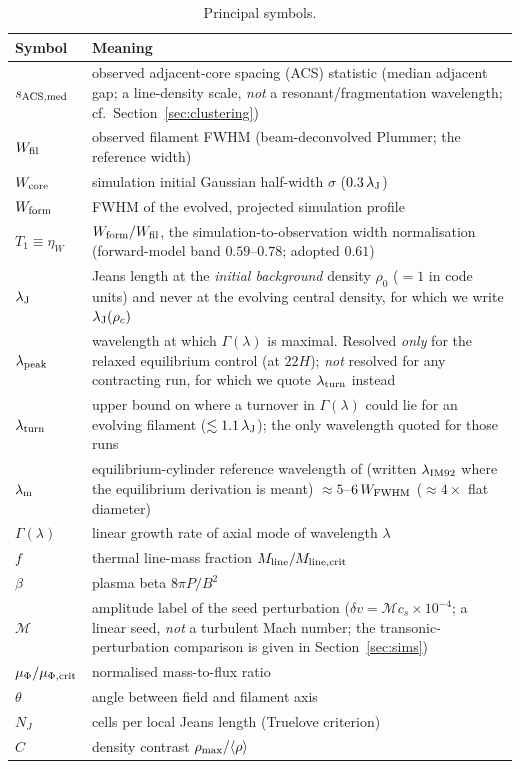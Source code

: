 \documentclass[usenatbib,twoside,twocolumn]{mnras}
\begin{document}
\begin{table}
\caption{Principal symbols.}
\label{tab:symbols}
\footnotesize
\setlength{\tabcolsep}{4pt}
\begin{tabular}{lp{6.1cm}}
\toprule
Symbol & Meaning \\
\midrule
$s_{\rm ACS,med}$ & observed adjacent-core spacing (ACS) statistic (median adjacent gap; a line-density scale, \emph{not} a resonant/fragmentation wavelength; cf.\ Section~\ref{sec:clustering}) \\
$W_{\rm fil}$ & observed filament FWHM (beam-deconvolved Plummer; the reference width) \\
$W_{\rm core}$ & simulation initial Gaussian half-width $\sigma$ ($0.3\,\lambda_{\rm J}$) \\
$W_{\rm form}$ & FWHM of the evolved, projected simulation profile \\
$T_1\!\equiv\!\eta_W$ & $W_{\rm form}/W_{\rm fil}$, the simulation-to-observation width normalisation (forward-model band $0.59$--$0.78$; adopted $0.61$) \\
$\lambda_{\rm J}$ & Jeans length at the \emph{initial background} density $\rho_0$ ($=1$ in code units) and never at the evolving central density, for which we write $\lambda_{\rm J}(\rho_c)$ \\
$\lambda_{\rm peak}$ & wavelength at which $\Gamma(\lambda)$ is maximal. Resolved \emph{only} for the relaxed equilibrium control (at $22H$); \emph{not} resolved for any contracting run, for which we quote $\lambda_{\rm turn}$ instead \\
$\lambda_{\rm turn}$ & upper bound on where a turnover in $\Gamma(\lambda)$ could lie for an evolving filament ($\lesssim1.1\,\lambda_{\rm J}$); the only wavelength quoted for those runs \\
$\lambda_{\rm m}$ & equilibrium-cylinder reference wavelength of \citet{Inutsuka1992} (written $\lambda_{\rm IM92}$ where the equilibrium derivation is meant) $\approx5$--$6\,W_{\rm FWHM}$ ($\approx4\times$ flat diameter) \\
$\Gamma(\lambda)$ & linear growth rate of axial mode of wavelength $\lambda$ \\
$f$ & thermal line-mass fraction $M_{\rm line}/M_{\rm line,crit}$ \\
$\beta$ & plasma beta $8\pi P/B^2$ \\
$\mathcal{M}$ & amplitude label of the seed perturbation ($\delta v=\mathcal{M}c_s\times10^{-4}$; a linear seed, \emph{not} a turbulent Mach number; the transonic-perturbation comparison is given in Section~\ref{sec:sims}) \\
$\mu_\Phi/\mu_{\Phi,\rm crit}$ & normalised mass-to-flux ratio \\
$\theta$ & angle between field and filament axis \\
$N_J$ & cells per local Jeans length (Truelove criterion) \\
$C$ & density contrast $\rho_{\rm max}/\langle\rho\rangle$ \\
\bottomrule
\end{tabular}
\end{table}
\end{document}
